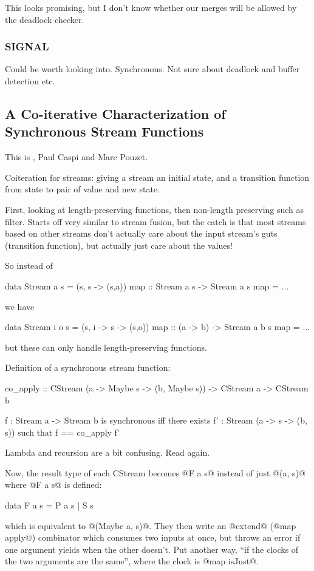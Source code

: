 This looks promising, but I don't know whether our merges will be allowed by the deadlock checker.

\subsubsection{SIGNAL}
Could be worth looking into. Synchronous. Not sure about deadlock and buffer detection etc.


\subsection{A Co-iterative Characterization of Synchronous Stream Functions}
This is \cite{caspi1998co}, Paul Caspi and Marc Pouzet.

Coiteration for streams: giving a stream an initial state, and a transition function from state to pair of value and new state.

First, looking at length-preserving functions, then non-length preserving such as filter.
Starts off very similar to stream fusion, but the catch is that most streams based on other streams don't actually care about the input stream's guts (transition function), but actually just care about the values!

So instead of

\begin{code}
data Stream a s = (s, s -> (s,a))
map :: Stream a s -> Stream a s
map = ...
\end{code}
we have
\begin{code}
data Stream i o s = (s, i -> s -> (s,o))
map :: (a -> b) -> Stream a b s
map = ...
\end{code}
but these can only handle length-preserving functions.


Definition of a synchronous stream function:
\begin{code}
co_apply :: CStream (a -> Maybe s -> (b, Maybe s))
         -> CStream a
         -> CStream b

 f : Stream a -> Stream b
is synchronous iff there exists
 f' : Stream (a -> s -> (b, s))
such that
 f == co_apply f'
\end{code}

Lambda and recursion are a bit confusing. Read again.

Now, the result type of each CStream becomes @F a s@ instead of just @(a, s)@ where @F a s@ is defined:
\begin{code}
data F a s
 = P a s
 | S   s
\end{code}
which is equivalent to @(Maybe a, s)@. They then write an @extend@ (@map apply@) combinator which consumes two inputs at once, but throws an error if one argument yields when the other doesn't. Put another way, ``if the clocks of the two arguments are the same'', where the clock is @map isJust@.

